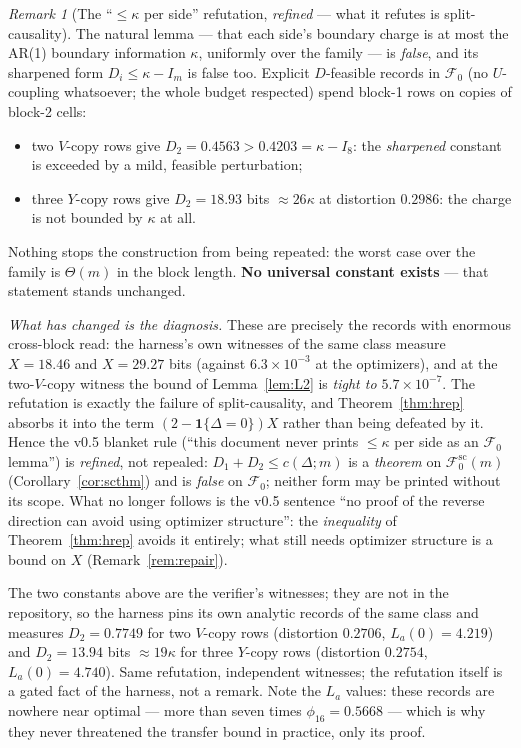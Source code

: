 \documentclass[11pt]{article}
\theoremstyle{definition}
\theoremstyle{remark}
\newtheorem{remark}{Remark}
\begin{document}
\begin{remark}[The ``$\le\kappa$ per side'' refutation, \emph{refined}
--- what it refutes is split-causality]
\label{rem:refute}
The natural lemma --- that each side's boundary charge is at most the
AR(1) boundary information $\kappa$, uniformly over the family --- is
\emph{false}, and its sharpened form $D_i\le\kappa-I_m$ is false too.
Explicit $D$-feasible records in $\mathcal F_0$ (no $U$-coupling
whatsoever; the whole budget respected) spend block-1 rows on copies of
block-2 cells:
\begin{itemize}
\item two $V$-copy rows give $D_2=0.4563>0.4203=\kappa-I_8$: the
\emph{sharpened} constant is exceeded by a mild, feasible
perturbation;
\item three $Y$-copy rows give $D_2=18.93$ bits $\approx26\kappa$ at
distortion $0.2986$: the charge is not bounded by $\kappa$ at all.
\end{itemize}
Nothing stops the construction from being repeated: the worst case over
the family is $\Theta(m)$ in the block length. \textbf{No universal
constant exists} --- that statement stands unchanged.

\emph{What has changed is the diagnosis.} These are precisely the
records with enormous cross-block read: the harness's own witnesses of
the same class measure $X=18.46$ and $X=29.27$ bits (against
$6.3\times10^{-3}$ at the optimizers), and at the two-$V$-copy witness
the bound of Lemma~\ref{lem:L2} is \emph{tight to
$5.7\times10^{-7}$}. The refutation is exactly the failure of
split-causality, and Theorem~\ref{thm:hrep} absorbs it into the term
$(2-\mathbf 1\{\Delta=0\})X$ rather than being defeated by it. Hence
the v0.5 blanket rule (``this document never prints $\le\kappa$ per
side as an $\mathcal F_0$ lemma'') is \emph{refined}, not repealed:
$D_1+D_2\le c(\Delta;m)$ is a \emph{theorem} on
$\mathcal F_0^{\mathrm{sc}}(m)$ (Corollary~\ref{cor:scthm}) and is
\emph{false} on $\mathcal F_0$; neither form may be printed without its
scope. What no longer follows is the v0.5 sentence ``no proof of the
reverse direction can avoid using optimizer structure'': the
\emph{inequality} of Theorem~\ref{thm:hrep} avoids it entirely; what
still needs optimizer structure is a bound on $X$
(Remark~\ref{rem:repair}).

The two constants above are the verifier's witnesses; they are not in
the repository, so the harness pins its own analytic records of the
same class and measures $D_2=0.7749$ for two $V$-copy rows (distortion
$0.2706$, $L_a(0)=4.219$) and $D_2=13.94$ bits $\approx19\kappa$ for
three $Y$-copy rows (distortion $0.2754$, $L_a(0)=4.740$). Same
refutation, independent witnesses; the refutation itself is a gated
fact of the harness, not a remark. Note the $L_a$ values: these records
are nowhere near optimal --- more than seven times $\phi_{16}=0.5668$
--- which is why they never threatened the transfer bound in practice,
only its proof.
\end{remark}
\end{document}
